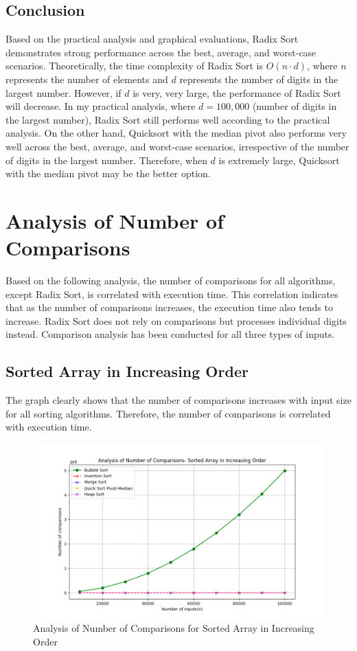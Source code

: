 \documentclass[a4paper,12pt]{report}
\begin{document}
\subsection{Conclusion}
Based on the practical analysis and graphical evaluations, Radix Sort demonstrates strong performance across the best, average, and worst-case scenarios. Theoretically, the time complexity of Radix Sort is \(O(n \cdot d)\), where \(n\) represents the number of elements and \(d\) represents the number of digits in the largest number. However, if \(d\) is very, very large, the performance of Radix Sort will decrease. In my practical analysis, where \(d = 100,000\) (number of digits in the largest number), Radix Sort still performs well according to the practical analysis.
On the other hand, Quicksort with the median pivot also performs very well across the best, average, and worst-case scenarios, irrespective of the number of digits in the largest number. Therefore, when \(d\) is extremely large, Quicksort with the median pivot may be the better option.

\section{Analysis of Number of Comparisons}
Based on the following analysis, the number of comparisons for all algorithms, except Radix Sort, is correlated with execution time. This correlation indicates that as the number of comparisons increases, the execution time also tends to increase. Radix Sort does not rely on comparisons but processes individual digits instead. Comparison analysis has been conducted for all three types of inputs.
\newline
\subsection{Sorted Array in Increasing Order}
The graph clearly shows that the number of comparisons increases with input size for all sorting algorithms. Therefore, the number of comparisons is correlated with execution time.
\begin{figure}[H]
	\centering
	\includegraphics[width=.9\textwidth]{./Comparison_Sorted.png}
	\caption{Analysis of Number of Comparisons for  Sorted Array in Increasing Order}
	\label{fig:Comparisonsorting}
\end{figure}
\end{document}

